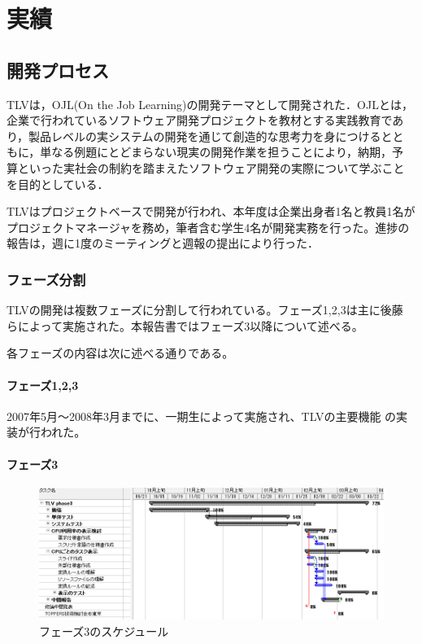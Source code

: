 \chapter{実績}
\section{開発プロセス}
TLVは，OJL(On the Job Learning)の開発テーマとして開発された．OJLとは，
企業で行われているソフトウェア開発プロジェクトを教材とする実践教育であ
り，製品レベルの実システムの開発を通じて創造的な思考力を身につけるとと
もに，単なる例題にとどまらない現実の開発作業を担うことにより，納期，予
算といった実社会の制約を踏まえたソフトウェア開発の実際について学ぶこと
を目的としている．

TLVはプロジェクトベースで開発が行われ、本年度は企業出身者1名と教員1名が
プロジェクトマネージャを務め，筆者含む学生4名が開発実務を行った。進捗の
報告は，週に1度のミーティングと週報の提出により行った．

\subsection{フェーズ分割}
TLVの開発は複数フェーズに分割して行われている。フェーズ1,2,3は主に後藤
ら\cite{goto}によって実施された。本報告書ではフェーズ3以降について述べる。

各フェーズの内容は次に述べる通りである。

\subsubsection{フェーズ1,2,3}
2007年5月～2008年3月までに、一期生によって実施され、TLVの主要機能
の実装が行われた\cite{goto}。

\subsubsection{フェーズ3}
\begin{figure}
\centering
\includegraphics[width=\textwidth]{schedule3.png}
\caption{フェーズ3のスケジュール}\label{fig:sch3}
\end{figure}

